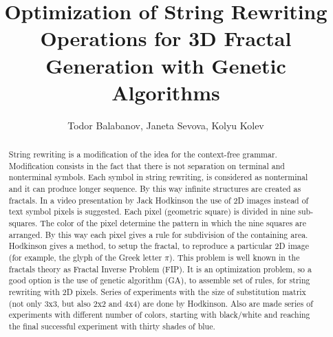 \documentclass[runningheads]{llncs}
\begin{document}
\title{Optimization of String Rewriting Operations for 3D Fractal Generation with Genetic Algorithms}

\author{Todor Balabanov, Janeta Sevova, Kolyu Kolev}



\maketitle

\begin{abstract}
String rewriting is a modification of the idea for the context-free grammar. Modification consists in the fact that there is not separation on terminal and nonterminal symbols. Each symbol in string rewriting, is considered as nonterminal and it can produce longer sequence. By this way infinite structures are created as fractals. In a video presentation by Jack Hodkinson the use of 2D images instead of text symbol pixels is suggested. Each pixel (geometric square) is divided in nine sub-squares. The color of the pixel determine the pattern in which the nine squares are arranged. By this way each pixel gives a rule for subdivision of the containing area. Hodkinson gives a method, to setup the fractal, to reproduce a particular 2D image (for example, the glyph of the Greek letter $\pi$). This problem is well known in the fractals theory as Fractal Inverse Problem (FIP). It is an optimization problem, so a good option is the use of genetic algorithm (GA), to assemble set of rules, for string rewriting with 2D pixels. Series of experiments with the size of substitution matrix (not only 3x3, but also 2x2 and 4x4) are done by Hodkinson. Also are made series of experiments with different number of colors, starting with black/white and reaching the final successful experiment with thirty shades of blue.

\end{abstract}
\end{document}
